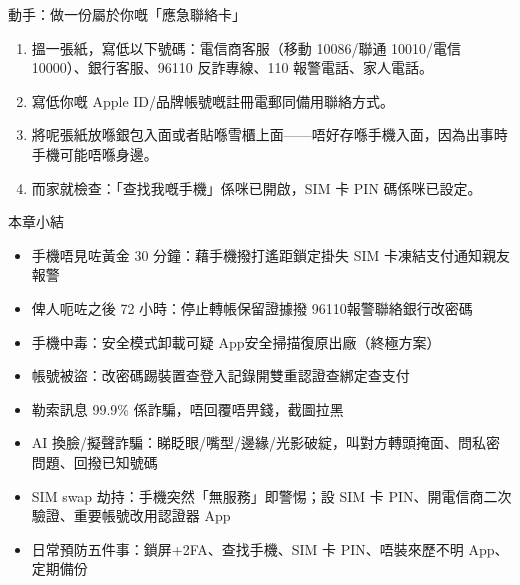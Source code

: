\begin{tcbpractice}{動手：做一份屬於你嘅「應急聯絡卡」}
\begin{enumerate}
  \item 搵一張紙，寫低以下號碼：電信商客服（移動 10086/聯通 10010/電信 10000）、銀行客服、96110 反詐專線、110 報警電話、家人電話。
  \item 寫低你嘅 Apple ID/品牌帳號嘅註冊電郵同備用聯絡方式。
  \item 將呢張紙放喺銀包入面或者貼喺雪櫃上面——唔好存喺手機入面，因為出事時手機可能唔喺身邊。
  \item 而家就檢查：「查找我嘅手機」係咪已開啟，SIM 卡 PIN 碼係咪已設定。
\end{enumerate}

\end{tcbpractice}

\begin{tcbsummary}{本章小結}
\begin{itemize}
  \item 手機唔見咗黃金 30 分鐘：藉手機撥打遙距鎖定掛失 SIM 卡凍結支付通知親友報警
  \item 俾人呃咗之後 72 小時：停止轉帳保留證據撥 96110報警聯絡銀行改密碼
  \item 手機中毒：安全模式卸載可疑 App安全掃描復原出廠（終極方案）
  \item 帳號被盜：改密碼踢裝置查登入記錄開雙重認證查綁定查支付
  \item 勒索訊息 99.9\% 係詐騙，唔回覆唔畀錢，截圖拉黑
  \item AI 換臉/擬聲詐騙：睇眨眼/嘴型/邊緣/光影破綻，叫對方轉頭掩面、問私密問題、回撥已知號碼
  \item SIM swap 劫持：手機突然「無服務」即警惕；設 SIM 卡 PIN、開電信商二次驗證、重要帳號改用認證器 App
  \item 日常預防五件事：鎖屏+2FA、查找手機、SIM 卡 PIN、唔裝來歷不明 App、定期備份
\end{itemize}

\end{tcbsummary}
